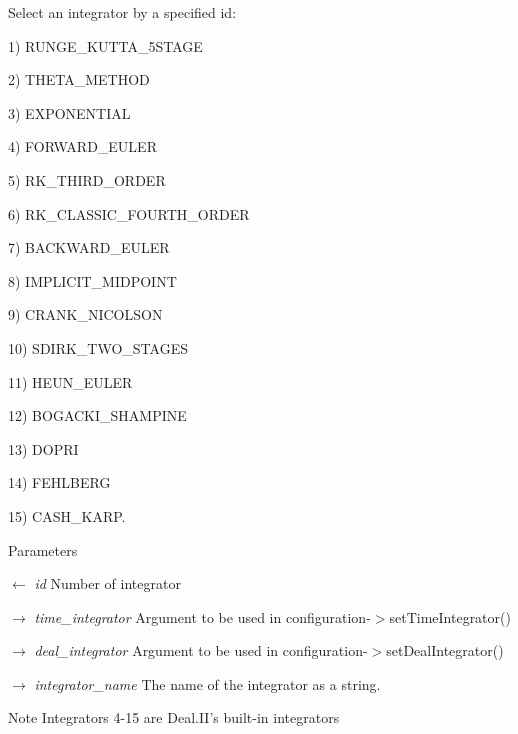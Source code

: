 Select an integrator by a specified id:
\begin{DoxyItemize}
\item 1) RUNGE\_\-KUTTA\_\-5STAGE
\item 2) THETA\_\-METHOD
\item 3) EXPONENTIAL
\item 4) FORWARD\_\-EULER
\item 5) RK\_\-THIRD\_\-ORDER
\item 6) RK\_\-CLASSIC\_\-FOURTH\_\-ORDER
\item 7) BACKWARD\_\-EULER
\item 8) IMPLICIT\_\-MIDPOINT
\item 9) CRANK\_\-NICOLSON
\item 10) SDIRK\_\-TWO\_\-STAGES
\item 11) HEUN\_\-EULER
\item 12) BOGACKI\_\-SHAMPINE
\item 13) DOPRI
\item 14) FEHLBERG
\item 15) CASH\_\-KARP. 
\end{DoxyItemize}
\begin{DoxyParams}{Parameters}
\item[\mbox{$\leftarrow$} {\em id}]Number of integrator \item[\mbox{$\rightarrow$} {\em time\_\-integrator}]Argument to be used in configuration-\/$>$setTimeIntegrator() \item[\mbox{$\rightarrow$} {\em deal\_\-integrator}]Argument to be used in configuration-\/$>$setDealIntegrator() \item[\mbox{$\rightarrow$} {\em integrator\_\-name}]The name of the integrator as a string. \end{DoxyParams}
\begin{DoxyNote}{Note}
Integrators 4-\/15 are Deal.II's built-\/in integrators 
\end{DoxyNote}

